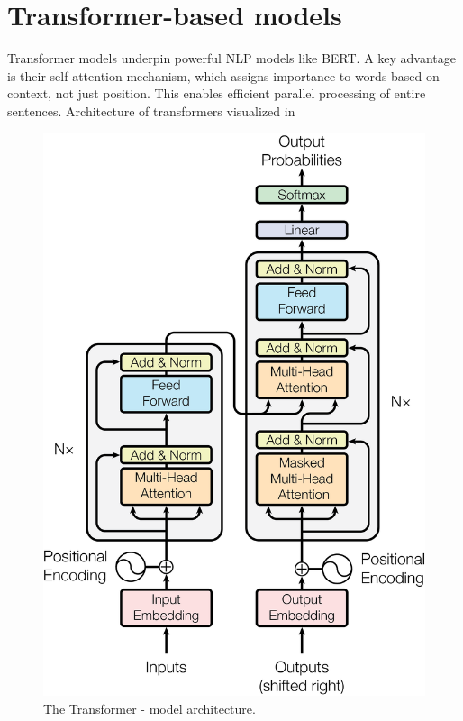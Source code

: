 \section{Transformer-based models}
Transformer models \cite{vaswani2023attention} underpin powerful NLP models like BERT.
A key advantage is their self-attention mechanism, which assigns importance to words based on context, not just position.
This enables efficient parallel processing of entire sentences.
Architecture of transformers visualized in 

\begin{figure}[h]
    \centering
    \includegraphics[scale=0.6]{src/fig/imgs/transformer_arch.png}
    \caption{The Transformer - model architecture.}
    \label{fig:model-arch}
\end{figure}

